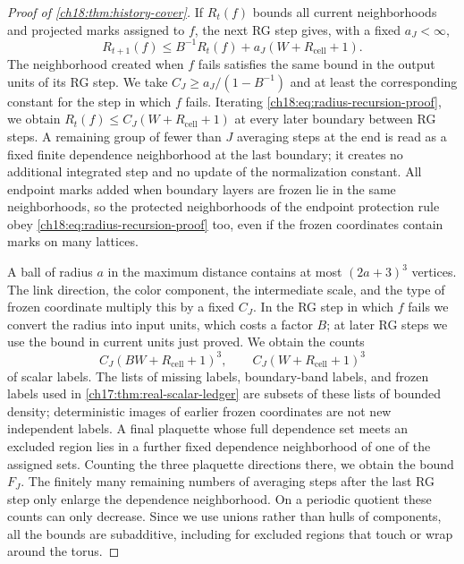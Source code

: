 \begin{proof}[Proof of \cref{ch18:thm:history-cover}]
If $R_t(f)$ bounds all current neighborhoods and projected marks assigned to $f$, the next RG step gives, with a fixed $a_J<\infty$,
\begin{equation}\label{ch18:eq:radius-recursion-proof}
 R_{t+1}(f)\le B^{-1}R_t(f)
                         +a_J(W+R_{\mathrm{cell}}+1).
\end{equation}
The neighborhood created when $f$ fails satisfies the same bound in the output units of its RG step. We take $C_J\ge a_J/(1-B^{-1})$ and at least the corresponding constant for the step in which $f$ fails. Iterating \eqref{ch18:eq:radius-recursion-proof}, we obtain $R_t(f)\le C_J(W+R_{\mathrm{cell}}+1)$ at every later boundary between RG steps. A remaining group of fewer than $J$ averaging steps at the end is read as a fixed finite dependence neighborhood at the last boundary; it creates no additional integrated step and no update of the normalization constant. All endpoint marks added when boundary layers are frozen lie in the same neighborhoods, so the protected neighborhoods of the endpoint protection rule obey \eqref{ch18:eq:radius-recursion-proof} too, even if the frozen coordinates contain marks on many lattices.

A ball of radius $a$ in the maximum distance contains at most $(2a+3)^3$ vertices. The link direction, the color component, the intermediate scale, and the type of frozen coordinate multiply this by a fixed $C_J$. In the RG step in which $f$ fails we convert the radius into input units, which costs a factor $B$; at later RG steps we use the bound in current units just proved. We obtain the counts
\[
 C_J(BW+R_{\mathrm{cell}}+1)^3,
 \qquad C_J(W+R_{\mathrm{cell}}+1)^3
\]
of scalar labels. The lists of missing labels, boundary-band labels, and frozen labels used in \cref{ch17:thm:real-scalar-ledger} are subsets of these lists of bounded density; deterministic images of earlier frozen coordinates are not new independent labels. A final plaquette whose full dependence set meets an excluded region lies in a further fixed dependence neighborhood of one of the assigned sets. Counting the three plaquette directions there, we obtain the bound $F_J$. The finitely many remaining numbers of averaging steps after the last RG step only enlarge the dependence neighborhood. On a periodic quotient these counts can only decrease. Since we use unions rather than hulls of components, all the bounds are subadditive, including for excluded regions that touch or wrap around the torus.


\end{proof}
